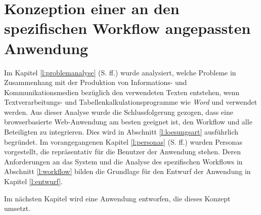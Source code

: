 \section{Konzeption einer an den spezifischen Workflow angepassten Anwendung}\label{l:konzeption}

Im Kapitel \ref{l:problemanalyse} (S.\pageref{l:problemanalyse} ff.) wurde analysiert, welche Probleme in Zusammenhang mit der Produktion von Informations- und Kommunikationsmedien bezüglich den verwendeten Texten entstehen, wenn Textverarbeitungs- und Tabellenkalkulationsprogramme wie  \emph{Word} und  verwendet werden. Aus dieser Analyse wurde die Schlussfolgerung gezogen, dass eine browserbasierte Web-Anwendung am besten geeignet ist, den Workflow und alle Beteiligten zu integrieren. Dies wird in Abschnitt \ref{l:loesungsart} ausführlich begründet. Im vorangegangenen Kapitel \ref{l:personas} (S.\pageref{l:personas} ff.) wurden Personas vorgestellt, die repräsentativ für die Benutzer der Anwendung stehen. Deren Anforderungen an das System und die Analyse des spezifischen Workflows in Abschnitt \ref{l:workflow} bilden die Grundlage für den Entwurf der Anwendung in Kapitel \ref{l:entwurf}.









\bigskip

Im nächsten Kapitel wird eine Anwendung entworfen, die dieses Konzept umsetzt.

\pagebreak